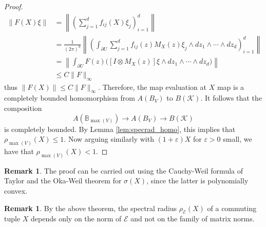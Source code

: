 \documentclass[12pt]{amsart}
\numberwithin{equation}{section}
\theoremstyle{definition}
\newtheorem{remark}[theorem]{Remark}
\newcommand{\cE}{\mathcal{E}}
\newcommand{\cK}{\mathcal{K}}
\newcommand{\bB}{\mathbb{B}}
\begin{document}
\begin{proof}
\begin{align*}
    \|F(X) \xi\| 
    &= \left\| \left(\sum_{j=1}^d f_{ij}(X) \xi_j \right)_{i=1}^d \right\| \\ 
    &= \frac{1}{(2 \pi)^d} \left\| \left(\int_{\partial U} \sum_{j=1}^d f_{ij}(z) M_X(z) \xi_j  \wedge dz_1 \wedge \cdots \wedge dz_d\right)_{i=1}^d \right\| \\ 
    &= \left\| \int_{\partial U} F(z) \big(\left[I \otimes M_X(z)\right] \xi \wedge dz_1 \wedge \cdots \wedge dz_d \big) \right\| \\
    &\leq C \|F\|_{\infty}
    \end{align*}
    thus $\|F(X)\| \leq C \|F\|_{\infty}$. 
    Therefore, the map evaluation at $X$ map is a completely bounded homomorphism from $A(B_V)$ to $B(\cK)$. 
    It follows that the composition 
    \[
    A(\bB_{\max(V)}) \to A(B_V) \to B(\cK)
    \]
    is completely bounded. By Lemma \ref{lem:specrad_homo}, this implies that $\rho_{\max(V)}(X) \leq 1$. Now arguing similarly with $(1 + \varepsilon) X$ for $\varepsilon > 0$ small, we have that $\rho_{\max(V)}(X) < 1$.
\end{proof}

\begin{remark}
The proof can be carried out using the Cauchy-Weil formula of Taylor \cite{Taylor-analytic_func_calc} and the Oka-Weil theorem for $\sigma(X)$, since the latter is polynomially convex.
\end{remark}

\begin{remark}
     By the above theorem, the spectral radius $\rho_{\cE}(X)$ of a commuting tuple $X$ depends only on the norm of $\cE$ and not on the family of matrix norms.
\end{remark}
\end{document}
